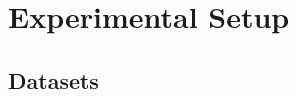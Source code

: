 \documentclass{article}
\begin{document}
%
%
%
%
%
%
%
%
%
%
%
%
%
%
%
%
%
%
%
%
%
%
%
%
%
%
%
%
%
%
%
%
%
%
%

















\section{Experimental Setup}\label{Sec 4}




 \subsection{Datasets}
 
\end{document}
